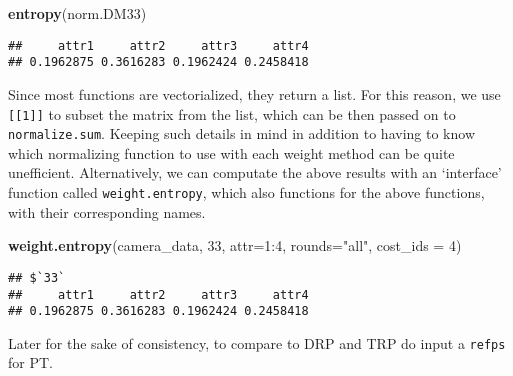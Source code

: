 \documentclass[]{article}
\newenvironment{Shaded}{\begin{snugshade}}{\end{snugshade}}
\newcommand{\KeywordTok}[1]{\textcolor[rgb]{0.13,0.29,0.53}{\textbf{{#1}}}}
\newcommand{\DataTypeTok}[1]{\textcolor[rgb]{0.13,0.29,0.53}{{#1}}}
\newcommand{\DecValTok}[1]{\textcolor[rgb]{0.00,0.00,0.81}{{#1}}}
\newcommand{\StringTok}[1]{\textcolor[rgb]{0.31,0.60,0.02}{{#1}}}
\newcommand{\NormalTok}[1]{{#1}}
\begin{document}
\begin{Shaded}
\begin{Highlighting}[]
\KeywordTok{entropy}\NormalTok{(norm.DM33)}
\end{Highlighting}
\end{Shaded}

\begin{verbatim}
##     attr1     attr2     attr3     attr4 
## 0.1962875 0.3616283 0.1962424 0.2458418
\end{verbatim}

Since most functions are vectorialized, they return a list. For this
reason, we use \texttt{[[1]]} to subset the matrix from the list, which
can be then passed on to \texttt{normalize.sum}. Keeping such details in
mind in addition to having to know which normalizing function to use
with each weight method can be quite unefficient. Alternatively, we can
computate the above results with an `interface' function called
\texttt{weight.entropy}, which also functions for the above functions,
with their corresponding names.

\begin{Shaded}
\begin{Highlighting}[]
\KeywordTok{weight.entropy}\NormalTok{(camera_data, }\DecValTok{33}\NormalTok{, }\DataTypeTok{attr=}\DecValTok{1}\NormalTok{:}\DecValTok{4}\NormalTok{, }\DataTypeTok{rounds=}\StringTok{"all"}\NormalTok{, }\DataTypeTok{cost_ids =} \DecValTok{4}\NormalTok{)}
\end{Highlighting}
\end{Shaded}

\begin{verbatim}
## $`33`
##     attr1     attr2     attr3     attr4 
## 0.1962875 0.3616283 0.1962424 0.2458418
\end{verbatim}

Later for the sake of consistency, to compare to DRP and TRP do input a
\texttt{refps} for PT.
\end{document}
